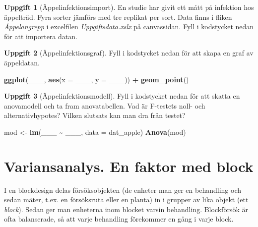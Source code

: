 \documentclass[
]{book}
\newenvironment{Shaded}{\begin{snugshade}}{\end{snugshade}}
\newcommand{\AttributeTok}[1]{\textcolor[rgb]{0.13,0.29,0.53}{#1}}
\newcommand{\FunctionTok}[1]{\textcolor[rgb]{0.13,0.29,0.53}{\textbf{#1}}}
\newcommand{\NormalTok}[1]{#1}
\newcommand{\OtherTok}[1]{\textcolor[rgb]{0.56,0.35,0.01}{#1}}
\newcommand{\SpecialCharTok}[1]{\textcolor[rgb]{0.81,0.36,0.00}{\textbf{#1}}}
\theoremstyle{definition}
\theoremstyle{definition}
\theoremstyle{definition}
\newtheorem{exercise}{Uppgift}[chapter]
\theoremstyle{definition}
\theoremstyle{remark}
\begin{document}
\begin{exercise}[Äppelinfektionsimport]
En studie har givit ett mått på infektion hos äppelträd. Fyra sorter jämförs med tre replikat per sort. Data finns i fliken \emph{Äppelangrepp} i excelfilen \emph{Uppgiftsdata.xslx} på canvassidan. Fyll i kodstycket nedan för att importera datan.
\end{exercise}

\begin{exercise}[Äppelinfektionsgraf]

Fyll i kodstycket nedan för att skapa en graf av äppeldatan.

\begin{Shaded}
\begin{Highlighting}[]
\FunctionTok{ggplot}\NormalTok{(\_\_\_, }\FunctionTok{aes}\NormalTok{(}\AttributeTok{x =}\NormalTok{ \_\_\_, }\AttributeTok{y =}\NormalTok{ \_\_\_)) }\SpecialCharTok{+}
  \FunctionTok{geom\_point}\NormalTok{()}
\end{Highlighting}
\end{Shaded}

\end{exercise}

\begin{exercise}[Äppelinfektionsmodell]

Fyll i kodstycket nedan för att skatta en anovamodell och ta fram anovatabellen. Vad är F-testets noll- och alternativhypotes? Vilken slutsats kan man dra från testet?

\begin{Shaded}
\begin{Highlighting}[]
\NormalTok{mod }\OtherTok{\textless{}{-}} \FunctionTok{lm}\NormalTok{(\_\_\_ }\SpecialCharTok{\textasciitilde{}}\NormalTok{ \_\_\_, }\AttributeTok{data =}\NormalTok{ dat\_apple)}
\FunctionTok{Anova}\NormalTok{(mod)}
\end{Highlighting}
\end{Shaded}

\end{exercise}

\hypertarget{variansanalys.-en-faktor-med-block}{%
\section{Variansanalys. En faktor med block}\label{variansanalys.-en-faktor-med-block}}

I en blockdesign delas försöksobjekten (de enheter man ger en behandling och sedan mäter, t.ex. en försöksruta eller en planta) in i grupper av lika objekt (ett \emph{block}). Sedan ger man enheterna inom blocket varsin behandling. Blockförsök är ofta balanserade, så att varje behandling förekommer en gång i varje block.
\end{document}
